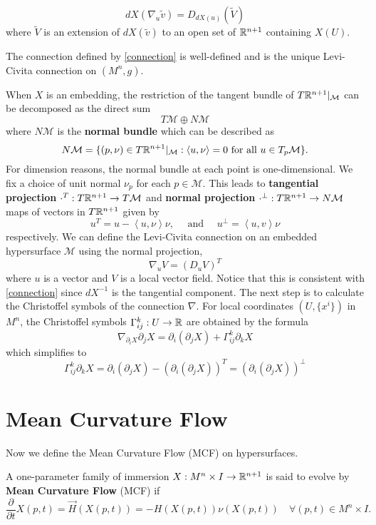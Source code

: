 \begin{equation}
    dX(\nabla_{u}\tilde{v}) = D_{dX(u)}(\tilde{V}) \label{connection}
\end{equation}
where $ \tilde{V} $ is an extension of $ dX(\tilde{v}) $ to an open set of $ \mathbb{R}^{n+1} $ containing $ X(U) $.  
\begin{lemma}
    The connection defined by \cref{connection} is well-defined and is the unique Levi-Civita connection on $ (M^{n},g) $.
\end{lemma}
When $ X $ is an embedding, the restriction of the tangent bundle of $ T\mathbb{R}^{n+1}|_{\mathcal{M}} $ can be decomposed as the direct sum 
\[ T\mathcal{M}\oplus N\mathcal{M}  \]
where $ N\mathcal{M} $ is the \textbf{normal bundle}  which can be described as 
\[ N\mathcal{M} = \{(p,\nu) \in T\mathbb{R}^{n+1}|_{ \mathcal{M}} : \left< u, \nu \right> =0 \text{ for all } u \in T_{p} \mathcal{M}\}. \]
For dimension reasons, the normal bundle at each point is one-dimensional. We fix a choice of unit normal $ \nu_{p} $ for each $ p \in \mathcal{M} $. This leads to \textbf{tangential projection} $ \cdot^{T} : T\mathbb{R}^{n+1} \to T \mathcal{M}$  and \textbf{normal projection} $ \cdot^{\perp} : T\mathbb{R}^{n+1} \to N \mathcal{M} $ maps of vectors in $ T\mathbb{R}^{n+1} $ given by 
\[ u^{T} = u-\left< u,\nu \right> \nu,\quad \text{ and }\quad u^{\perp} = \left< u,v \right>\nu\]
respectively. We can define the Levi-Civita connection on an embedded hypersurface $ \mathcal{M} $ using the normal projection, 
\[ \nabla_{u}V  = (D_{u}V)^{T}\]
where $ u  $ is a vector and $ V $ is a local vector field. Notice that this is consistent with \cref{connection} since $ dX^{-1} $ is the tangential component. The next step is to calculate the Christoffel symbols of the connection $ \nabla $. For local coordinates $ (U, \{x^{i}\}) $ in $ M^{n} $, the Christoffel symbols $ \Gamma_{ij}^{k}: U \to \mathbb{R} $ are obtained by the formula
\[ \nabla_{ \partial_{i}X} \partial_{j}X = \partial_{i} (\partial_{j}X) + \Gamma_{ij}^{k} \partial_{k}X \]
which simplifies to 
\[ \Gamma_{ij}^{k} \partial_{k}X = \partial_{i}( \partial_{j}X) - (\partial_{i}( \partial_{j}X))^{T} = (\partial_{i}( \partial_{j}X))^{\perp}\]



\section{Mean Curvature Flow}

Now we define the Mean Curvature Flow (MCF) on hypersurfaces. 
\begin{defn}
    A one-parameter family of immersion $ X: M^{n} \times I \to \mathbb{R}^{n+1} $ is said to evolve by \textbf{Mean Curvature Flow} (MCF) if 
		\begin{equation}
            \frac{ \partial}{ \partial t}X(p,t) = \vec{H}(X(p,t))  = -H(X(p,t))\nu(X(p,t)) \quad \forall (p,t) \in M^{n} \times I.
        \end{equation}
\end{defn}

